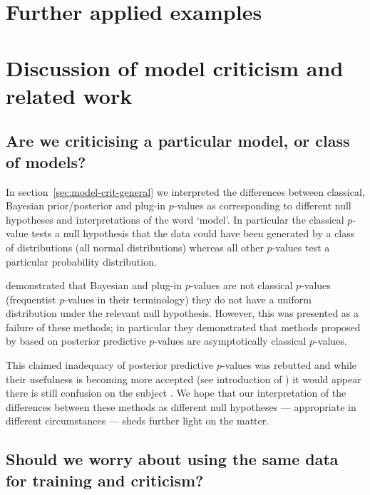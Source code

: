 \section{Further applied examples}


\section{Discussion of model criticism and related work}

\subsection{Are we criticising a particular model, or class of models?}

In section~\ref{sec:model-crit-general} we interpreted the differences between classical, Bayesian prior/posterior and plug-in $p$-values as corresponding to different null hypotheses and interpretations of the word `model'.
In particular the classical $p$-value tests a null hypothesis that the data could have been generated by a class of distributions (\eg all normal distributions) whereas all other $p$-values test a particular probability distribution.

\citet{Robins2000-oz} demonstrated that Bayesian and plug-in $p$-values are not classical $p$-values (frequentist $p$-values in their terminology) \ie they do not have a uniform distribution under the relevant null hypothesis.
However, this was presented as a failure of these methods; in particular they demonstrated that methods proposed by \citet{Bayarri1999-ty} based on posterior predictive $p$-values are asymptotically classical $p$-values.

This claimed inadequacy of posterior predictive $p$-values was rebutted \citep{Gelman2003-xx} and while their usefulness is becoming more accepted (see \eg introduction of \cite{Bayarri2007-cp}) it would appear there is still confusion on the subject \citep{Gelman2013-am}.
We hope that our interpretation of the differences between these methods as different null hypotheses --- appropriate in different circumstances --- sheds further light on the matter.

\subsection{Should we worry about using the same data for training and criticism?}

